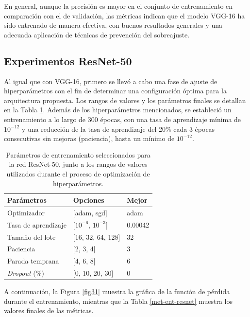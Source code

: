 En general, aunque la precisión es mayor en el conjunto de entrenamiento en comparación con el de validación, las métricas indican que el modelo VGG-16 ha sido entrenado de manera efectiva, con buenos resultados generales y una adecuada aplicación de técnicas de prevención del sobreajuste.

\subsection{Experimentos ResNet-50}

Al igual que con VGG-16, primero se llevó a cabo una fase de ajuste de hiperparámetros con el fin de determinar una configuración óptima para la arquitectura propuesta. Los rangos de valores y los parámetros finales se detallan en la Tabla \ref{hiper-resnet}. Además de los hiperparámetros mencionados, se estableció un entrenamiento a lo largo de 300 épocas, con una tasa de aprendizaje mínima de $10^{-12}$ y una reducción de la tasa de aprendizaje del 20\% cada 3 épocas consecutivas sin mejoras (paciencia), hasta un mínimo de $10^{-12}$.

\begin{table}[h]
	\centering
	\begin{tabular}{lll}
	\hline
	Parámetros          & Opciones                 & Mejor \\ \hline
	Optimizador         & {[}adam, sgd{]}          &  adam \\
	Tasa de aprendizaje & {[}$10^{-6}$, $10^{-3}${]}  &  0.00042  \\
	Tamaño del lote     & {[}16, 32, 64, 128{]}    &  32     \\
	Paciencia           & {[}2, 3, 4{]}            &  3   \\
	Parada temprana     & {[}4, 6, 8{]}            &  6   \\
	\textit{Dropout} (\%)    & {[}0, 10, 20, 30{]} &  0  \\ \hline
	\end{tabular}
	\caption[Selección de parámetros de entrenamiento ResNet-50.]{Parámetros de entrenamiento seleccionados para la red ResNet-50, junto a los rangos de valores utilizados durante el proceso de optimización de hiperparámetros.}
	\label{hiper-resnet}
\end{table}

A continuación, la Figura \ref{fig31} muestra la gráfica de la función de pérdida durante el entrenamiento, mientras que la Tabla \ref{met-ent-resnet} muestra los valores finales de las métricas.

